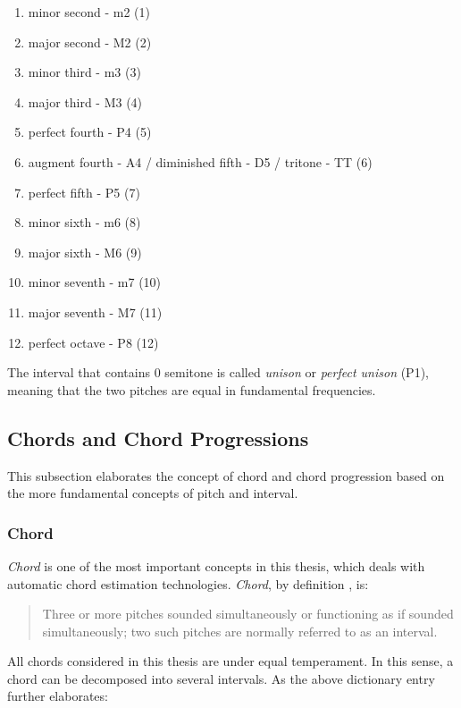 \begin{enumerate}[label=(\alph*)]
\item minor second - m2 (1)
\item major second - M2 (2)
\item minor third - m3 (3)
\item major third - M3 (4)
\item perfect fourth - P4 (5)
\item augment fourth - A4 / diminished fifth - D5 / tritone - TT (6)
\item perfect fifth - P5 (7)
\item minor sixth - m6 (8)
\item major sixth - M6 (9)
\item minor seventh - m7 (10)
\item major seventh - M7 (11)
\item perfect octave - P8 (12)
\end{enumerate}
The interval that contains $0$ semitone is called {\it unison} or {\it perfect unison} (P1), meaning that the two pitches are equal in fundamental frequencies. %

\subsection{Chords and Chord Progressions}
This subsection elaborates the concept of chord and chord progression based on the more fundamental concepts of pitch and interval.
\subsubsection{Chord}
{\it Chord} is one of the most important concepts in this thesis, which deals with automatic chord estimation technologies. {\it Chord}, by definition \cite{randel1999harvard}, is:

\begin{quote}
Three or more pitches sounded simultaneously or functioning as if sounded simultaneously; two such pitches are normally referred to as an interval.
\end{quote}

All chords considered in this thesis are under equal temperament. In this sense, a chord can be decomposed into several intervals. As the above dictionary entry further elaborates:

